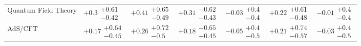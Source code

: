 \begin{table}[H]
\begin{tabular}{lllllll}
Quantum Field Theory                      &        $+0.3\substack{+0.61 \\ -0.42}$ &       $+0.41\substack{+0.65 \\ -0.49}$ &       $+0.31\substack{+0.62 \\ -0.43}$ &         $-0.03\substack{+0.4 \\ -0.4}$ &       $+0.22\substack{+0.61 \\ -0.48}$ &         $-0.01\substack{+0.4 \\ -0.4}$ \\
AdS/CFT                                   &       $+0.17\substack{+0.64 \\ -0.45}$ &        $+0.26\substack{+0.72 \\ -0.5}$ &       $+0.18\substack{+0.65 \\ -0.45}$ &         $-0.05\substack{+0.4 \\ -0.5}$ &       $+0.21\substack{+0.74 \\ -0.57}$ &         $-0.03\substack{+0.4 \\ -0.5}$ \\
\bottomrule
\end{tabular}\normalsize\renewcommand{\arraystretch}{1}
\end{table}
